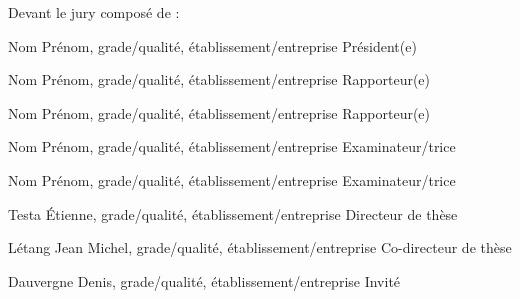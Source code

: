 \documentclass[11pt,a4paper]{book}
\begin{document}
\fontsize{12pt}{14pt}\selectfont
Devant le jury composé de :
\bigskip

\fontsize{11pt}{13pt}\selectfont

Nom Prénom, grade/qualité, établissement/entreprise \hfill Président(e) %

\bigskip

Nom Prénom, grade/qualité, établissement/entreprise \hfill  Rapporteur(e)

Nom Prénom, grade/qualité, établissement/entreprise \hfill Rapporteur(e)

Nom Prénom, grade/qualité, établissement/entreprise \hfill Examinateur/trice

Nom Prénom, grade/qualité, établissement/entreprise \hfill Examinateur/trice

\bigskip

Testa \'{E}tienne, grade/qualité, établissement/entreprise \hfill Directeur de thèse

L\'{e}tang Jean Michel, grade/qualité, établissement/entreprise \hfill Co-directeur de thèse %

Dauvergne Denis, grade/qualité, établissement/entreprise \hfill Invité %

\newpage

\end{document}
